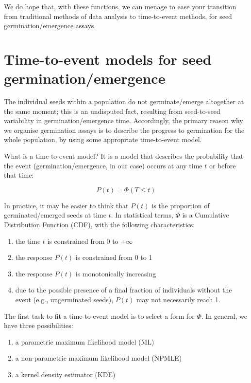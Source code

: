 \documentclass[
]{book}
\providecommand{\tightlist}{%
  \setlength{\itemsep}{0pt}\setlength{\parskip}{0pt}}
\begin{document}
We do hope that, with these functions, we can menage to ease your transition from traditional methods of data analysis to time-to-event methods, for seed germination/emergence assays.

\hypertarget{time-to-event-models-for-seed-germinationemergence}{%
\chapter{Time-to-event models for seed germination/emergence}\label{time-to-event-models-for-seed-germinationemergence}}

The individual seeds within a population do not germinate/emerge altogether at the same moment; this is an undisputed fact, resulting from seed-to-seed variability in germination/emergence time. Accordingly, the primary reason why we organise germination assays is to describe the progress to germination for the whole population, by using some appropriate time-to-event model.

What is a time-to-event model? It is a model that describes the probability that the event (germination/emergence, in our case) occurs at any time \(t\) or before that time:

\[ P(t) = \Phi(T \le t)\]

In practice, it may be easier to think that \(P(t)\) is the proportion of germinated/emerged seeds at time \(t\). In statistical terms, \(\Phi\) is a Cumulative Distribution Function (CDF), with the following characteristics:

\begin{enumerate}
\def\labelenumi{\arabic{enumi}.}
\tightlist
\item
  the time \(t\) is constrained from 0 to +\(\infty\)
\item
  the response \(P(t)\) is constrained from 0 to 1
\item
  the response \(P(t)\) is monotonically increasing
\item
  due to the possible presence of a final fraction of individuals without the event (e.g., ungerminated seeds), \(P(t)\) may not necessarily reach 1.
\end{enumerate}

The first task to fit a time-to-event model is to select a form for \(\Phi\). In general, we have three possibilities:

\begin{enumerate}
\def\labelenumi{\arabic{enumi}.}
\tightlist
\item
  a parametric maximum likelihood model (ML)
\item
  a non-parametric maximum likelihood model (NPMLE)
\item
  a kernel density estimator (KDE)
\end{enumerate}
\end{document}
